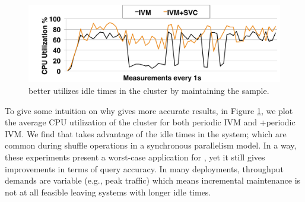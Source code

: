 \begin{figure}[t]
\centering
\includegraphics[scale=0.12]{exp/con_7.pdf}\vspace{-1em}
 \caption{\svc better utilizes idle times in the cluster by maintaining the sample.\label{conv-5}} \vspace{-1.5em}
\end{figure}

To give some intuition on why \svc gives more accurate results, in Figure \ref{conv-5}, we plot the average CPU utilization of the cluster for both periodic IVM and \svcnospace+periodic IVM. 
We find that \svc takes advantage of the idle times in the system; which are common during shuffle operations in a synchronous parallelism model.
In a way, these experiments present a worst-case application for \svc, yet it still gives improvements in terms of query accuracy.
In many deployments, throughput demands are variable (e.g., peak traffic) which means incremental maintenance is not at all feasible leaving systems with longer idle times.
\fi



